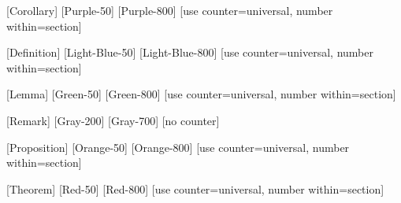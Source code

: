 
 [Corollary] [Purple-50] [Purple-800] 
[use counter=universal, number within=section]

\newenvironment{corollary}[1][] {\begin{Corollary}{#1}{}} {\end{Corollary}}

 [Definition] [Light-Blue-50] [Light-Blue-800]
[use counter=universal, number within=section]

\newenvironment{definition}[1][] {\begin{Definition}{#1}{}} {\end{Definition}}

\theoremstyle{definition}
\newtheorem*{Example}{\color{primary}Example}

\newenvironment{example}
{\begin{Example}}
{\hfill\ensuremath{\color{primary}\diamondsuit}\end{Example}}

 [Lemma] [Green-50] [Green-800]
[use counter=universal, number within=section]

\newenvironment{lemma}[1][] {\begin{Lemma}{#1}{}} {\end{Lemma}}

 [Remark] [Gray-200] [Gray-700] [no counter]

\newenvironment{remark}[1][] {\begin{Remark}{#1}{}} {\end{Remark}}

 [Proposition] [Orange-50] [Orange-800]
[use counter=universal, number within=section]

\newenvironment{proposition}[1][] {\begin{Proposition}{#1}{}} {\end{Proposition}}

 [Theorem] [Red-50] [Red-800]
[use counter=universal, number within=section]

